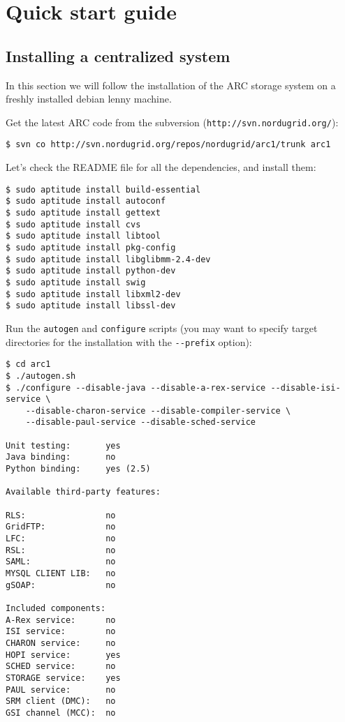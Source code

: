 \documentclass{book}
\begin{document}
\chapter{Quick start guide} %

\section{Installing a centralized system} %

In this section we will follow the installation of the ARC storage system on a freshly installed debian lenny machine. 

Get the latest ARC code from the subversion (\verb!http://svn.nordugrid.org/!):

\begin{verbatim}
$ svn co http://svn.nordugrid.org/repos/nordugrid/arc1/trunk arc1
\end{verbatim}

Let's check the README file for all the dependencies, and install them:

\begin{verbatim}
$ sudo aptitude install build-essential
$ sudo aptitude install autoconf
$ sudo aptitude install gettext
$ sudo aptitude install cvs
$ sudo aptitude install libtool
$ sudo aptitude install pkg-config
$ sudo aptitude install libglibmm-2.4-dev
$ sudo aptitude install python-dev
$ sudo aptitude install swig
$ sudo aptitude install libxml2-dev
$ sudo aptitude install libssl-dev
\end{verbatim}

Run the \verb!autogen! and \verb!configure! scripts (you may want to specify target directories for the installation with the \verb!--prefix! option):

\begin{verbatim}
$ cd arc1
$ ./autogen.sh
$ ./configure --disable-java --disable-a-rex-service --disable-isi-service \
    --disable-charon-service --disable-compiler-service \
    --disable-paul-service --disable-sched-service

Unit testing:       yes
Java binding:       no
Python binding:     yes (2.5)

Available third-party features:

RLS:                no
GridFTP:            no
LFC:                no
RSL:                no
SAML:               no
MYSQL CLIENT LIB:   no
gSOAP:              no

Included components:
A-Rex service:      no
ISI service:        no
CHARON service:     no
HOPI service:       yes
SCHED service:      no
STORAGE service:    yes
PAUL service:       no
SRM client (DMC):   no
GSI channel (MCC):  no

\end{verbatim}
\end{document}
